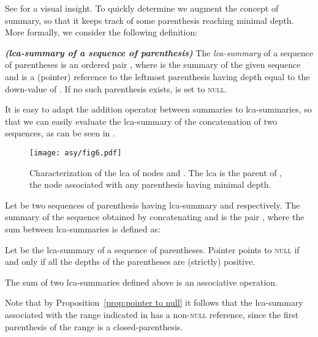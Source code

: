 \documentclass[a4paper,USenglish]{lipics}
\begin{document}
			See  for a visual insight. To quickly determine  we augment the concept of summary, so that it keeps track of some parenthesis reaching minimal depth. More formally, we consider the following definition:
			\begin{definition}\hspace{0mm}\emph{\textbf{(lca-summary of a sequence of parenthesis)}}
				The \emph{lca-summary} of a sequence of parentheses is an ordered pair , where  is the summary of the given sequence and  is a (pointer) reference to the leftmost parenthesis having depth equal to the down-value of . If no such parenthesis exists,  is set to \textsc{null}.
			\end{definition}
			
			It is easy to adapt the addition operator between summaries to lca-summaries, so that we can easily evaluate the lca-summary of the concatenation of two sequences, as can be seen in .

			\begin{figure}[t]

				\texttt{[image: asy/fig6.pdf]}\\
				\caption{Characterization of the lca of nodes  and . The lca is the parent of , the node associated with any parenthesis having minimal depth.\label{fig:lca}}

			\end{figure}

			\begin{lemma}
				\label{prop:sum of lca-summaries}
				Let  be two sequences of parenthesis having lca-summary  and  respectively. The summary of the sequence  obtained by concatenating  and  is the pair , where the sum between lca-summaries is defined as:
				
			\end{lemma}
			\begin{lemma}
				\label{prop:pointer to null}
				Let  be the lca-summary of a sequence of parentheses. Pointer  points to \textsc{null} if and only if all the depths of the parentheses are (strictly) positive.
			\end{lemma}
			\begin{lemma}
				\label{prop:lca-summary sum associativity}
				The sum of two lca-summaries defined above is an associative operation.
			\end{lemma}
			
			Note that by Proposition~\ref{prop:pointer to null} it follows that the lca-summary associated with the range indicated in  has a non-\textsc{null} reference, since the first parenthesis of the range is a closed-parenthesis.
			
\end{document}
